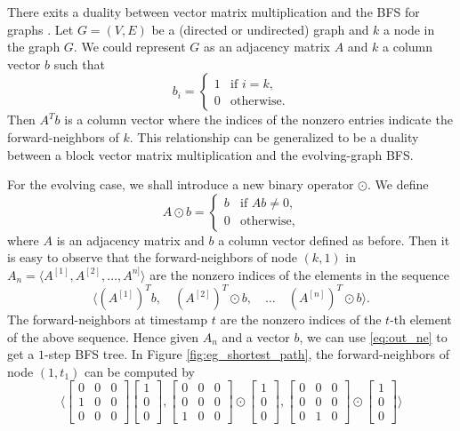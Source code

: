 \documentclass[11pt, conference, , compsocconf]{IEEEtran}
\theoremstyle{definition}
\begin{document}
There exits a duality between vector matrix multiplication and the BFS
for graphs \cite{kegi11}. Let $G = (V, E)$ be a (directed or undirected) graph
and $k$ a node in the graph $G$. We could represent $G$ as an adjacency 
matrix $A$ and $k$ a column vector $b$ such that 
\[
b_i = 
\begin{cases}
1 & \mbox{if $i = k$,} \\
0 & \mbox{otherwise.}
\end{cases}
\]
Then $A^Tb$ is a column vector where the indices of the nonzero entries 
indicate the forward-neighbors of $k$. This relationship can be generalized to be
a duality between a block vector matrix multiplication and the 
evolving-graph BFS.

For the evolving case, we shall introduce a new binary operator $\odot$.
We define
\[
A \odot b = 
\begin{cases}
b & \mbox{if $Ab \ne 0$,} \\
0 & \mbox{otherwise,}
\end{cases}
\]
where $A$ is an adjacency matrix and $b$ a column vector defined as before.
Then it is easy to observe that 
the forward-neighbors of node $(k, 1)$ in $A_n = \langle A^{[1]}, A^{[2]}, \ldots, A^{n]}\rangle$ are the nonzero indices of the 
elements in the sequence
\begin{equation}
\label{eq:out_ne}
\big\langle (A^{[1]})^Tb, \quad  (A^{[2]})^T\odot b, \quad \ldots \quad (A^{[n]})^T\odot b \big\rangle.
\end{equation}
The forward-neighbors at timestamp $t$ are the nonzero indices of the $t$-th element of the above sequence.
Hence given $A_n$ and a vector $b$, we can use \eqref{eq:out_ne} to 
get a $1$-step  BFS tree. In Figure \ref{fig:eg_shortest_path}, the forward-neighbors
of node $(1, t_1)$ can be computed by
\[
\Big\langle
  \begin{bmatrix} 
    0 & 0 & 0 \\
    1 & 0 & 0 \\
    0 & 0 & 0
  \end{bmatrix} 
\begin{bmatrix}
1 \\
0 \\
0
\end{bmatrix}
,
 \begin{bmatrix}
   0 & 0 & 0 \\
   0 & 0 & 0 \\
   1 & 0 & 0 
 \end{bmatrix}
\odot
\begin{bmatrix}
1 \\
0 \\
0
\end{bmatrix}
,
 \begin{bmatrix}
  0 & 0 & 0 \\
  0 & 0 & 0 \\
  0 & 1 & 0 
 \end{bmatrix}
\odot
\begin{bmatrix}
1 \\
0 \\
0
\end{bmatrix}
\Big\rangle
\]
\end{document}
